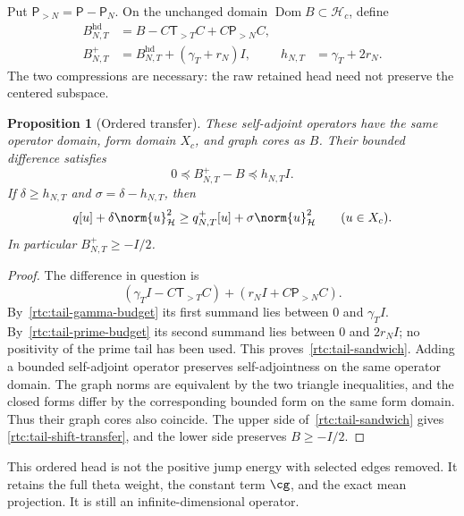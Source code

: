 \documentclass[11pt,a4paper]{article}
\numberwithin{equation}{section}
\newtheorem{proposition}[theorem]{Proposition}
\theoremstyle{definition}\newtheorem{definition}[theorem]{Definition}
\theoremstyle{remark}\newtheorem{remark}[theorem]{Remark}
\newcommand{\Hh}{\mathcal H}\newcommand{\Hw}{\mathcal H}
\begin{document}
Put $\mathsf P_{>N}=\mathsf P-\mathsf P_N$.  On the unchanged domain
$\operatorname{Dom}B\subset\Hh_c$, define
\begin{align}
 B_{N,T}^{\mathrm{hd}}
 &=B-C\mathsf T_{>T}C+C\mathsf P_{>N}C,
 \label{rtc:tail-head}\\
 B_{N,T}^{+}
 &=B_{N,T}^{\mathrm{hd}}+(\gamma_T+r_N)I,
 & h_{N,T}&=\gamma_T+2r_N.
 \label{rtc:tail-upper}
\end{align}
The two compressions are necessary: the raw retained head need not
preserve the centered subspace.

\begin{proposition}[Ordered transfer]\label{rtc:tail-order}
These self-adjoint operators have the same operator domain, form domain
$X_c$, and graph cores as $B$.  Their bounded difference satisfies
\begin{equation}\label{rtc:tail-sandwich}
 0\preceq B_{N,T}^{+}-B\preceq h_{N,T}I.
\end{equation}
If $\delta\ge h_{N,T}$ and $\sigma=\delta-h_{N,T}$, then
\begin{equation}\label{rtc:tail-shift-transfer}
 q[u]+\delta\norm{u}_{\Hh}^2
 \ge q_{N,T}^{+}[u]+\sigma\norm{u}_{\Hh}^2
 \qquad(u\in X_c).
\end{equation}
In particular $B_{N,T}^{+}\ge-I/2$.
\end{proposition}
\begin{proof}
The difference in question is
\[
 (\gamma_T I-C\mathsf T_{>T}C)
       +(r_N I+C\mathsf P_{>N}C).
\]
By~\eqref{rtc:tail-gamma-budget} its first summand lies between $0$
and $\gamma_T I$.  By~\eqref{rtc:tail-prime-budget} its second
summand lies between $0$ and $2r_NI$; no positivity of the prime tail
has been used.  This proves~\eqref{rtc:tail-sandwich}.
Adding a bounded self-adjoint operator preserves self-adjointness on the
same operator domain.  The graph norms are equivalent by the two
triangle inequalities, and the closed forms differ by the corresponding
bounded form on the same form domain.  Thus their graph cores also
coincide.  The upper side of~\eqref{rtc:tail-sandwich} gives
\eqref{rtc:tail-shift-transfer}, and the lower side preserves $B\ge-I/2$.
\end{proof}
This ordered head is not the positive jump energy with selected edges
removed.  It retains the full theta weight, the constant term $\cg$, and
the exact mean projection.  It is still an infinite-dimensional operator.
\end{document}

